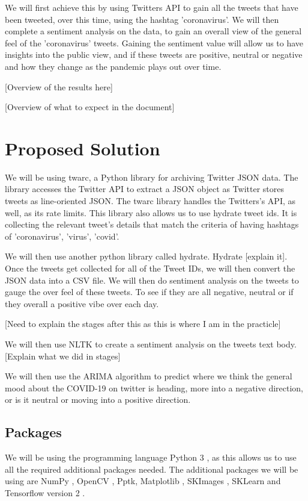 \documentclass[a4paper,10pt]{article}
\begin{document}
We will first achieve this by using Twitters API to gain all the tweets that have been tweeted, over this time, using the hashtag 'coronavirus'. We will then complete a sentiment analysis on the data, to gain an overall view of the general feel of the 'coronavirus' tweets. Gaining the sentiment value will allow us to have insights into the public view, and if these tweets are positive, neutral or negative and how they change as the pandemic plays out over time. 

[Overview of the results here]

[Overview of what to expect in the document]

\section{Proposed Solution}
We will be using twarc, a Python library for archiving Twitter JSON data. The library accesses the Twitter API to extract a JSON object as Twitter stores tweets as line-oriented JSON. The twarc library handles the Twitters's API, as well, as its rate limits. This library also allows us to use hydrate tweet ids. It is collecting the relevant tweet's details that match the criteria of having hashtags of 'coronavirus', 'virus', 'covid'.

We will then use another python library called hydrate. Hydrate [explain it]. Once the tweets get collected for all of the Tweet IDs, we will then convert the JSON data into a CSV file. We will then do sentiment analysis on the tweets to gauge the over feel of these tweets. To see if they are all negative, neutral or if they overall a positive vibe over each day.

[Need to explain the stages after this as this is where I am in the practicle]

We will then use NLTK to create a sentiment analysis on the tweets text body. [Explain what we did in stages]

We will then use the ARIMA algorithm to predict where we think the general mood about the COVID-19 on twitter is heading, more into a negative direction, or is it neutral or moving into a positive direction.



\subsection{Packages}
We will be using the programming language Python 3 \cite{Python}, as this allows us to use all the required additional packages needed. The additional packages we will be using are NumPy \cite{walt2011numpy}, OpenCV \cite{opencv_library}, Pptk, Matplotlib \cite{hunter2007matplotlib}, SKImages \cite{van2014scikit}, SKLearn \cite{sklearn_api} and Tensorflow version 2 \cite{tensorflow2015-whitepaper}.
\end{document}

